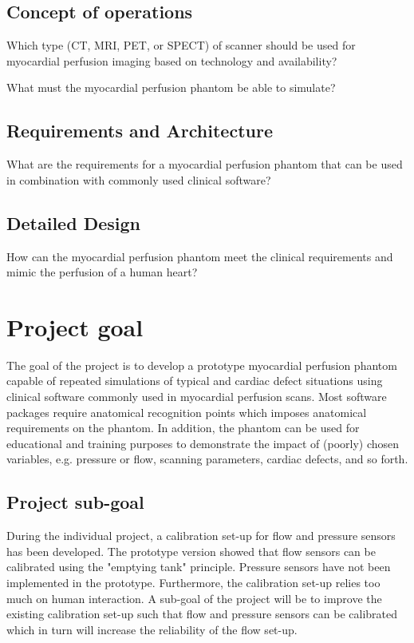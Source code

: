 \subsection{Concept of operations}
Which type (CT, MRI, PET, or SPECT) of scanner should be used for myocardial perfusion imaging based on technology and availability?

What must the myocardial perfusion phantom be able to simulate?

\subsection{Requirements and Architecture}
What are the requirements for a myocardial perfusion phantom that can be used in combination with commonly used clinical software?

\subsection{Detailed Design}
How can the myocardial perfusion phantom meet the clinical requirements and mimic the perfusion of a human heart?

\section{Project goal}
The goal of the project is to develop a prototype myocardial perfusion phantom capable of repeated simulations of typical and cardiac defect situations using clinical software commonly used in myocardial perfusion scans. Most software packages require anatomical recognition points which imposes anatomical requirements on the phantom. In addition, the phantom can be used for educational and training purposes to demonstrate the impact of (poorly) chosen variables, e.g. pressure or flow, scanning parameters, cardiac defects, and so forth.

\subsection*{Project sub-goal}
During the individual project, a calibration set-up for flow and pressure sensors has been developed. The prototype version showed that flow sensors can be calibrated using the "emptying tank" principle. Pressure sensors have not been implemented in the prototype. Furthermore, the calibration set-up relies too much on human interaction. A sub-goal of the project will be to improve the existing calibration set-up such that flow and pressure sensors can be calibrated which in turn will increase the reliability of the flow set-up.

